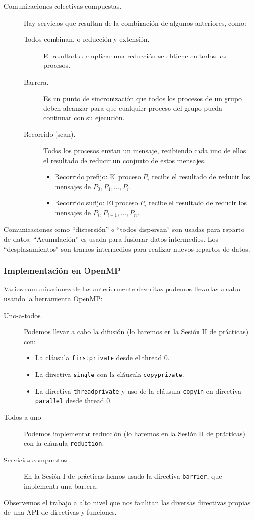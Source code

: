 \begin{description}
    \item [Comunicaciones colectivas compuestas.] Hay servicios que resultan de la combinación de algunos anteriores, como:
        \begin{description}
            \item [Todos combinan, o reducción y extensión.] El resultado de aplicar una reducción se obtiene en todos los procesos.
            \item [Barrera.] Es un punto de sincronización que todos los procesos de un grupo deben alcanzar para que cualquier proceso del grupo pueda continuar con su ejecución.
            \item [Recorrido (scan).] Todos los procesos envían un mensaje, recibiendo cada uno de ellos el resultado de reducir un conjunto de estos mensajes.
                \begin{itemize}
                    \item Recorrido prefijo: El proceso $P_i$ recibe el resultado de reducir los mensajes de $P_0, P_1, \ldots, P_i$.
                    \item Recorrido sufijo: El proceso $P_i$ recibe el resultado de reducir los mensajes de $P_i, P_{i+1}, \ldots, P_n$.
                \end{itemize}
        \end{description}
\end{description}

Comunicaciones como ``dispersión'' o ``todos dispersan'' son usadas para reparto de datos. ``Acumulación'' es usada para fusionar datos intermedios. Los ``desplazamientos'' son tramos intermedios para realizar nuevos repartos de datos. 

\subsubsection{Implementación en OpenMP} 
Varias comunicaciones de las anteriormente descritas podemos llevarlas a cabo usando la herramienta OpenMP:
\begin{description}
    \item [Uno-a-todos] Podemos llevar a cabo la difusión (lo haremos en la Sesión II de prácticas) con:
        \begin{itemize}
            \item La cláusula \verb|firstprivate| desde el thread 0.
            \item La directiva \verb|single| con la cláusula \verb|copyprivate|. 
            \item La directiva \verb|threadprivate| y uso de la cláusula \verb|copyin| en directiva \verb|parallel| desde thread 0.
        \end{itemize}
    \item [Todos-a-uno] Podemos implementar reducción (lo haremos en la Sesión II de prácticas) con la cláusula \verb|reduction|. 
    \item [Servicios compuestos] En la Sesión I de prácticas hemos usado la directiva \verb|barrier|, que implementa una barrera.
\end{description}
Observemos el trabajo a alto nivel que nos facilitan las diversas directivas propias de una API de directivas y funciones.

